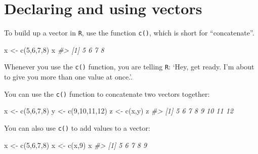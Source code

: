 \documentclass[
]{book}
\newenvironment{Shaded}{\begin{snugshade}}{\end{snugshade}}
\newcommand{\CommentTok}[1]{\textcolor[rgb]{0.56,0.35,0.01}{\textit{#1}}}
\newcommand{\DecValTok}[1]{\textcolor[rgb]{0.00,0.00,0.81}{#1}}
\newcommand{\FunctionTok}[1]{\textcolor[rgb]{0.00,0.00,0.00}{#1}}
\newcommand{\NormalTok}[1]{#1}
\newcommand{\OtherTok}[1]{\textcolor[rgb]{0.56,0.35,0.01}{#1}}
\begin{document}
\hypertarget{declaring-and-using-vectors}{%
\section*{Declaring and using vectors}\label{declaring-and-using-vectors}}

To build up a vector in \texttt{R}, use the function \texttt{c()}, which is short for ``concatenate''.

\begin{Shaded}
\begin{Highlighting}[]
\NormalTok{x }\OtherTok{\textless{}{-}} \FunctionTok{c}\NormalTok{(}\DecValTok{5}\NormalTok{,}\DecValTok{6}\NormalTok{,}\DecValTok{7}\NormalTok{,}\DecValTok{8}\NormalTok{)}
\NormalTok{x}
\CommentTok{\#\textgreater{} [1] 5 6 7 8}
\end{Highlighting}
\end{Shaded}

Whenever you use the \texttt{c()} function, you are telling \texttt{R}: `Hey, get ready. I'm about to give you more than one value at once.'.

You can use the \texttt{c()} function to concatenate two vectors together:

\begin{Shaded}
\begin{Highlighting}[]
\NormalTok{x }\OtherTok{\textless{}{-}} \FunctionTok{c}\NormalTok{(}\DecValTok{5}\NormalTok{,}\DecValTok{6}\NormalTok{,}\DecValTok{7}\NormalTok{,}\DecValTok{8}\NormalTok{)}
\NormalTok{y }\OtherTok{\textless{}{-}} \FunctionTok{c}\NormalTok{(}\DecValTok{9}\NormalTok{,}\DecValTok{10}\NormalTok{,}\DecValTok{11}\NormalTok{,}\DecValTok{12}\NormalTok{)}
\NormalTok{z }\OtherTok{\textless{}{-}} \FunctionTok{c}\NormalTok{(x,y)}
\NormalTok{z}
\CommentTok{\#\textgreater{} [1]  5  6  7  8  9 10 11 12}
\end{Highlighting}
\end{Shaded}

You can also use \texttt{c()} to add values to a vector:

\begin{Shaded}
\begin{Highlighting}[]
\NormalTok{x }\OtherTok{\textless{}{-}} \FunctionTok{c}\NormalTok{(}\DecValTok{5}\NormalTok{,}\DecValTok{6}\NormalTok{,}\DecValTok{7}\NormalTok{,}\DecValTok{8}\NormalTok{)}
\NormalTok{x }\OtherTok{\textless{}{-}} \FunctionTok{c}\NormalTok{(x,}\DecValTok{9}\NormalTok{)}
\NormalTok{x}
\CommentTok{\#\textgreater{} [1] 5 6 7 8 9}
\end{Highlighting}
\end{Shaded}
\end{document}
